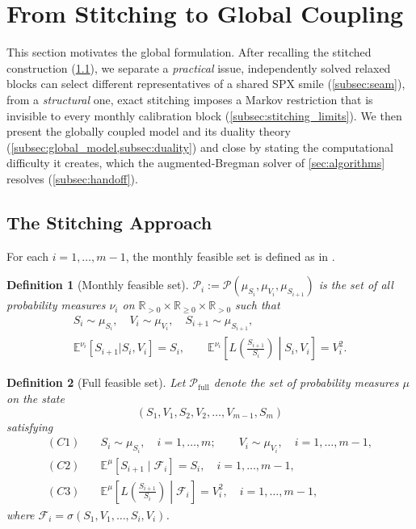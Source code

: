 \documentclass{article}
\newtheorem{definition}{Definition}[section]
\newcommand{\cF}{\mathcal{F}}
\newcommand{\cP}{\mathcal{P}}
\newcommand{\Embb}{\mathbb{E}}
\begin{document}
\section{From Stitching to Global Coupling}\label{sec:stitching_to_global}

This section motivates the global formulation.
After recalling the stitched construction (\cref{subsec:stitching}), we separate a \emph{practical} issue, independently solved relaxed blocks can select different representatives of a shared SPX smile (\cref{subsec:seam}), from a \emph{structural} one, exact stitching imposes a Markov restriction that is invisible to every monthly calibration block (\cref{subsec:stitching_limits}).
We then present the globally coupled model and its duality theory (\cref{subsec:global_model,subsec:duality}) and close by stating the computational difficulty it creates, which the augmented-Bregman solver of \cref{sec:algorithms} resolves (\cref{subsec:handoff}).

\subsection{The Stitching Approach}\label{subsec:stitching}

For each $i = 1, \ldots, m-1$, the monthly feasible set is defined as in \citet{guyon2020joint}.

\begin{definition}[Monthly feasible set]\label{def:monthly_feasible}
$\cP_i := \cP(\mu_{S_i}, \mu_{V_i}, \mu_{S_{i+1}})$ is the set of all probability measures $\nu_i$ on $\mathbb{R}_{>0} \times \mathbb{R}_{\geq 0} \times \mathbb{R}_{>0}$ such that
\begin{gather}\label{eq:monthly_constraints}
    S_i \sim \mu_{S_i}, \quad V_i \sim \mu_{V_i}, \quad S_{i+1} \sim \mu_{S_{i+1}}, \nonumber\\
    \Embb^{\nu_i}[S_{i+1}|S_i, V_i] = S_i, \qquad \Embb^{\nu_i}\!\left[L\!\left(\frac{S_{i+1}}{S_i}\right)\middle| S_i, V_i\right] = V_i^2.
\end{gather}
\end{definition}

\begin{definition}[Full feasible set]\label{def:full_feasible}
Let $\cP_{\mathrm{full}}$ denote the set of probability measures $\mu$ on the state
\[
(S_1,V_1,S_2,V_2,\ldots,V_{m-1},S_m)
\]
satisfying
\begin{align}
    (C1) &\quad S_i \sim \mu_{S_i},\quad i=1,\ldots,m;
    \qquad V_i \sim \mu_{V_i},\quad i=1,\ldots,m-1, \label{eq:C1}\\
    (C2) &\quad \Embb^\mu[S_{i+1}\mid\cF_i]=S_i,
    \quad i=1,\ldots,m-1, \label{eq:C2}\\
    (C3) &\quad \Embb^\mu\!\left[
    L\!\left(\frac{S_{i+1}}{S_i}\right)\middle|\cF_i
    \right]=V_i^2,
    \quad i=1,\ldots,m-1, \label{eq:C3}
\end{align}
where $\cF_i=\sigma(S_1,V_1,\ldots,S_i,V_i)$.
\end{definition}
\end{document}
